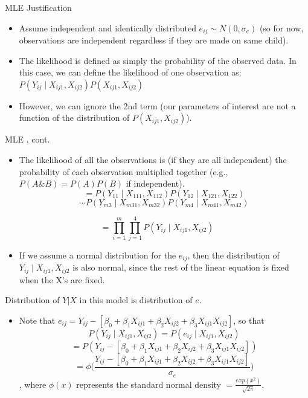 \documentclass[ignorenonframetext,]{beamer}
\providecommand{\tightlist}{%
  \setlength{\itemsep}{0pt}\setlength{\parskip}{0pt}}
\begin{document}
\begin{frame}{MLE Justification}

\begin{itemize}
\tightlist
\item
  Assume independent and identically distributed
  \(e_{ij} \sim N(0,\sigma_e)\) (so for now, observations are
  independent regardless if they are made on same child).
\item
  The likelihood is defined as simply the probability of the observed
  data. In this case, we can define the likelihood of one observation
  as: \(P(Y_{ij}\mid X_{ij1}, X_{ij2})P(X_{ij1},X_{ij2})\)\\
\item
  However, we can ignore the 2nd term (our parameters of interest are
  not a function of the distribution of \(P(X_{ij1},X_{ij2})\)).
\end{itemize}

\end{frame}

\begin{frame}{MLE , cont.}

\begin{itemize}
\tightlist
\item
  The likelihood of all the observations is (if they are all
  independent) the probability of each observation multiplied together
  (e.g., \(P(A \& B)=P(A)P(B)\) if independent).
  \[ = P(Y_{11} \mid X_{111},X_{112}) P(Y_{12} \mid X_{121},X_{122}) \]
  \[ \cdots P(Y_{m3} \mid X_{m31},X_{m32}) P(Y_{m4} \mid X_{m41},X_{m42})\]
\end{itemize}

\[ = \prod_{i=1}^m \prod_{j=1}^4 P(Y_{ij}\mid X_{ij1}, X_{ij2})\]

\begin{itemize}
\tightlist
\item
  If we assume a normal distribution for the \(e_{ij}\), then the
  distribution of \(Y_{ij} \mid X_{ij1}, X_{ij2}\) is also normal, since
  the rest of the linear equation is fixed when the X's are fixed.
\end{itemize}

\end{frame}

\begin{frame}{Distribution of \(Y|X\) in this model is distribution of
\(e\).}

\begin{itemize}
\tightlist
\item
  Note that
  \(e_{ij} = Y_{ij}-[\beta_0 +\beta_1 X_{ij1}+\beta_2 X_{ij2} + \beta_3 X_{ij1}X_{ij2}]\),
  so that
  \[P(Y_{ij} \mid X_{ij1}, X_{ij2}) = P(e_{ij} \mid X_{ij1}, X_{ij2}) \]
  \[= P(Y_{ij}-[\beta_0 +\beta_1 X_{ij1}+\beta_2 X_{ij2} + \beta_3 X_{ij1}X_{ij2}]) \]
  \[ = \phi \Big(\frac{Y_{ij}-[\beta_0 +\beta_1 X_{ij1}+\beta_2 X_{ij2} + \beta_3 X_{ij1}X_{ij2}]}{\sigma_e}\Big)\],
  where \(\phi(x)\) represents the standard normal density
  \(=\frac{exp(x^2)}{\sqrt{2 \pi} }\).
\end{itemize}

\end{frame}
\end{document}
